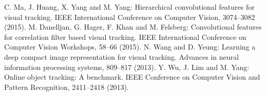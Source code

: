 \documentclass[runningheads,a4paper]{llncs}
\begin{document}
\begin{thebibliography}{8}
C. Ma, J. Huang, X. Yang and M. Yang: Hierarchical convolutional features for visual tracking. IEEE International Conference on Computer Vision, 3074--3082 (2015).
M. Danelljan, G. Hager, F. Khan and M. Felsberg: Convolutional features for correlation filter based visual tracking. IEEE International Conference on Computer Vision Workshops, 58--66 (2015).
N. Wang and D. Yeung: Learning a deep compact image representation for visual tracking. Advances in neural information processing systems, 809--817 (2013).
Y. Wu, J. Lim and M. Yang: Online object tracking: A benchmark. IEEE Conference on Computer Vision and Pattern Recognition, 2411--2418 (2013).


\end{thebibliography}
\end{document}
